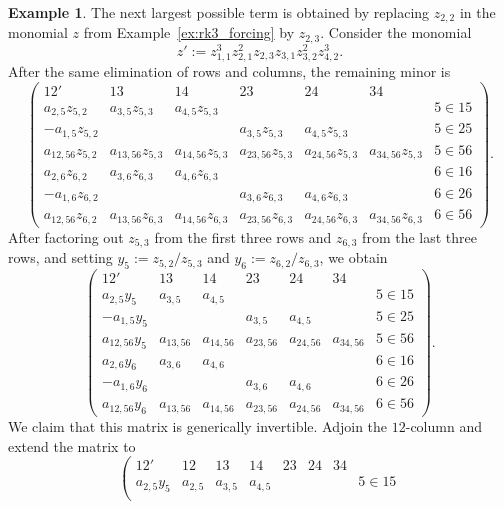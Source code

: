 \documentclass[12pt, letterpaper]{amsart}
\theoremstyle{definition}
\newtheorem{example}[theorem]{Example}
\begin{document}
\begin{example}\label{ex:rk3_forcing2}
The next largest possible term is obtained by replacing \(z_{2,2}\) in the monomial \(z\) from Example~\ref{ex:rk3_forcing} by \(z_{2,3}\). Consider the monomial
\[z' := z_{1,1}^3 z_{2,1}^2 z_{2,3} z_{3,1} z_{3,2}^2 z_{4,2}^3.\]
After the same elimination of rows and columns, the remaining minor is
\[
\left( \begin{array}{cccccc|c}
  12' & 13 & 14 & 23 & 24 & 34 & \\
  \hline a_{2,5}z_{5,2} & a_{3,5}z_{5,3} & a_{4,5}z_{5,3} &&&& 5\in 15\\
  -a_{1,5}z_{5,2} &&& a_{3,5}z_{5,3} & a_{4,5}z_{5,3} && 5\in 25\\
  a_{12,56}z_{5,2} & a_{13,56}z_{5,3} & a_{14,56}z_{5,3} & a_{23,56}z_{5,3} & a_{24,56}z_{5,3} & a_{34,56}z_{5,3} & 5\in 56\\
  a_{2,6}z_{6,2} & a_{3,6}z_{6,3} & a_{4,6}z_{6,3} &&&& 6\in 16\\
  -a_{1,6}z_{6,2} &&& a_{3,6}z_{6,3} & a_{4,6}z_{6,3} && 6\in 26\\
  a_{12,56}z_{6,2} & a_{13,56}z_{6,3} & a_{14,56}z_{6,3} & a_{23,56}z_{6,3} & a_{24,56}z_{6,3} & a_{34,56}z_{6,3} & 6\in 56
\end{array} \right).
\]
After factoring out \(z_{5,3}\) from the first three rows and \(z_{6,3}\) from the last three rows, and setting \(y_5:=z_{5,2}/z_{5,3}\) and \(y_6:=z_{6,2}/z_{6,3}\), we obtain
\[
\left( \begin{array}{cccccc|c}
  12' & 13 & 14 & 23 & 24 & 34 & \\
  \hline a_{2,5}y_5 & a_{3,5} & a_{4,5} &&&& 5\in 15\\
  -a_{1,5}y_5 &&& a_{3,5} & a_{4,5} && 5\in 25\\
  a_{12,56}y_5 & a_{13,56} & a_{14,56} & a_{23,56} & a_{24,56} & a_{34,56} & 5\in 56\\
  a_{2,6}y_6 & a_{3,6} & a_{4,6} &&&& 6\in 16\\
  -a_{1,6}y_6 &&& a_{3,6} & a_{4,6} && 6\in 26\\
  a_{12,56}y_6 & a_{13,56} & a_{14,56} & a_{23,56} & a_{24,56} & a_{34,56} & 6\in 56
\end{array} \right).
\]
We claim that this matrix is generically invertible. Adjoin the \(12\)-column and extend the matrix to
\[
\left( \begin{array}{ccccccc|c}
  12' & 12& 13 & 14 & 23 & 24 & 34 & \\
  \hline a_{2,5}y_5 &a_{2,5} & a_{3,5} & a_{4,5} &&&& 5\in 15\\

\end{array}\]
\end{example}
\end{document}
